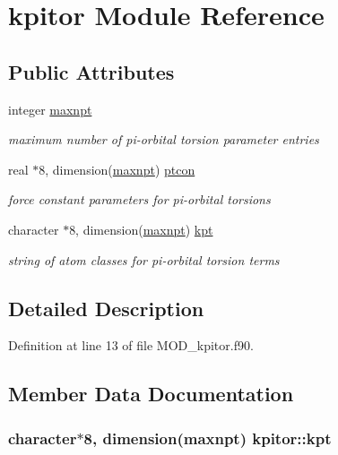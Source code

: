 \hypertarget{classkpitor}{\section{kpitor Module Reference}
\label{classkpitor}
}
\subsection*{Public Attributes}
\begin{DoxyCompactItemize}
\item 
integer \hyperlink{classkpitor_aee3241cd9ad325101f960cab1e5f7916}{maxnpt}
\begin{DoxyCompactList}\small\item\em maximum number of pi-\/orbital torsion parameter entries \end{DoxyCompactList}\item 
real $\ast$8, dimension(\hyperlink{classkpitor_aee3241cd9ad325101f960cab1e5f7916}{maxnpt}) \hyperlink{classkpitor_a95b760204df7792e9092a10acba281eb}{ptcon}
\begin{DoxyCompactList}\small\item\em force constant parameters for pi-\/orbital torsions \end{DoxyCompactList}\item 
character $\ast$8, dimension(\hyperlink{classkpitor_aee3241cd9ad325101f960cab1e5f7916}{maxnpt}) \hyperlink{classkpitor_a956691908298ae6a338d987e5f66a588}{kpt}
\begin{DoxyCompactList}\small\item\em string of atom classes for pi-\/orbital torsion terms \end{DoxyCompactList}\end{DoxyCompactItemize}


\subsection{Detailed Description}


Definition at line 13 of file M\-O\-D\-\_\-kpitor.\-f90.



\subsection{Member Data Documentation}
\hypertarget{classkpitor_a956691908298ae6a338d987e5f66a588}{
\subsubsection[{kpt}]{\setlength{\rightskip}{0pt plus 5cm}character$\ast$8, dimension({\bf maxnpt}) kpitor\-::kpt}}\label{classkpitor_a956691908298ae6a338d987e5f66a588}


